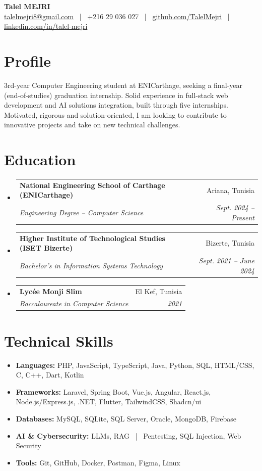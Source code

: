 \documentclass[a4paper,9.5pt]{article}
\makeatletter
\newcommand{\resumeSubheading}[4]{
  \vspace{-1pt}\item
    \begin{tabular*}{0.97\textwidth}{l@{\extracolsep{\fill}}r}
      \textbf{#1} & \small #2 \\
      \textit{\small #3} & \textit{\small #4} \\
    \end{tabular*}\vspace{-5pt}
}
\newcommand{\resumeSubItem}[2]{\item\small{\textbf{#1} #2}\vspace{-3pt}}
\newcommand{\resumeSubHeadingListStart}{\begin{itemize}[leftmargin=*]}
\newcommand{\resumeSubHeadingListEnd}{\end{itemize}}
\makeatother
\begin{document}
\begin{center}
  {\LARGE \textbf{Talel MEJRI}} \\[3pt]
  \small
  \href{mailto:talelmejri8@gmail.com}{talelmejri8@gmail.com} ~|~
  +216 29 036 027 ~|~
  \href{https://github.com/TalelMejri}{github.com/TalelMejri} ~|~
  \href{https://www.linkedin.com/in/talel-mejri}{linkedin.com/in/talel-mejri}
\end{center}

\vspace{-5pt}
\section{Profile}
\small{
3rd-year Computer Engineering student at ENICarthage, seeking a final-year (end-of-studies) graduation internship. Solid experience in full-stack web development and AI solutions integration, built through five internships. Motivated, rigorous and solution-oriented, I am looking to contribute to innovative projects and take on new technical challenges.
}

\vspace{-2pt}
\section{Education}
\resumeSubHeadingListStart
  \resumeSubheading
    {National Engineering School of Carthage (ENICarthage)}{Ariana, Tunisia}
    {Engineering Degree -- Computer Science}{Sept. 2024 -- Present}
  \resumeSubheading
    {Higher Institute of Technological Studies (ISET Bizerte)}{Bizerte, Tunisia}
    {Bachelor's in Information Systems Technology}{Sept. 2021 -- June 2024}
  \resumeSubheading
    {Lycée Monji Slim}{El Kef, Tunisia}
    {Baccalaureate in Computer Science}{2021}
\resumeSubHeadingListEnd

\vspace{-3pt}
\section{Technical Skills}
\resumeSubHeadingListStart
  \resumeSubItem{Languages:}{ PHP, JavaScript, TypeScript, Java, Python, SQL, HTML/CSS, C, C++, Dart, Kotlin}
  \resumeSubItem{Frameworks:}{ Laravel, Spring Boot, Vue.js, Angular, React.js, Node.js/Express.js, .NET, Flutter, TailwindCSS, Shadcn/ui}
  \resumeSubItem{Databases:}{ MySQL, SQLite, SQL Server, Oracle, MongoDB, Firebase}
  \resumeSubItem{AI \& Cybersecurity:}{ LLMs, RAG ~|~ Pentesting, SQL Injection, Web Security}
  \resumeSubItem{Tools:}{ Git, GitHub, Docker, Postman, Figma, Linux}
\resumeSubHeadingListEnd
\end{document}
